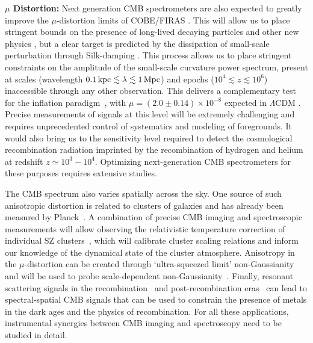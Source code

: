 {\bf $\mu$ Distortion:} Next generation CMB spectrometers are also expected to greatly improve the $\mu$-distortion 
limits of COBE/FIRAS \citep{Kogut2011PIXIE}. This will allow us to place stringent bounds on the presence of long-lived decaying 
particles \citep{Hu1993b, Chluba2013fore, Chluba2013PCA, Dimastrogiovanni2015} and other new 
physics \citep[e.g.,][]{Jedamzik2000, Tashiro2012, Dolgov2013, Tashiro2013, Caldwell2013, Yacine2015DM}, but a clear target is 
predicted by the dissipation of small-scale perturbation through Silk-damping \citep{Sunyaev1970diss, Daly1991, Hu1994, Chluba2012}. 
This process allows us to place stringent constraints on the amplitude of the small-scale curvature power spectrum, present at 
scales (wavelength $0.1 \,{\rm kpc} \lesssim \lambda \lesssim 1\, {\rm Mpc}$) and epochs ($10^4 \lesssim z\lesssim 10^6$) 
inaccessible through any other observation. This delivers a complementary test for the inflation 
paradigm~\citep{Chluba2012inflaton, Dent2012, Chluba2013PCA, Clesse2014, Cabass2016}, with $\mu=(2.0\pm0.14)\times 10^{-8}$ 
expected in $\Lambda$CDM \citep{Chluba2016LCDM}. Precise measurements of signals at this level will be extremely challenging 
and requires unprecedented control of systematics and modeling of foregrounds. It would also bring us to the sensitivity level required 
to detect the cosmological recombination radiation \citep{Sunyaev2009, Chluba2016} imprinted by the recombination of hydrogen 
and helium at redshift $z\simeq 10^3-10^4$. Optimizing next-generation CMB spectrometers for these purposes requires extensive studies.

The CMB spectrum also varies spatially across the sky. One source of such anisotropic distortion is related to clusters of galaxies 
and has already been measured by Planck~\citep{Planck2013SZ}. A combination of precise CMB imaging and spectroscopic measurements 
will allow observing the relativistic temperature correction of individual SZ clusters~\citep{Sazonov1998, Itoh98, Challinor98}, which 
will calibrate cluster scaling relations and inform our knowledge of the dynamical state of the cluster atmosphere. 
Anisotropy in the $\mu$-distortion can 
be created through `ultra-squeezed limit' non-Gaussianity~\citep{Pajer2012, Ganc2012} and will be used to probe 
scale-dependent non-Gaussianity~\citep{Biagetti2013, Razi2015}. Finally, resonant scattering signals in the 
recombination~\citep{Jose2005, Carlos2007Pol, Lewis2013} and post-recombination 
eras~\citep{Kaustuv2004, Schleicher2008} can lead to spectral-spatial CMB signals that can be used to constrain the 
presence of metals in the dark ages and the physics of recombination. For all these applications, instrumental synergies between 
CMB imaging and spectroscopy need to be studied in detail. 

